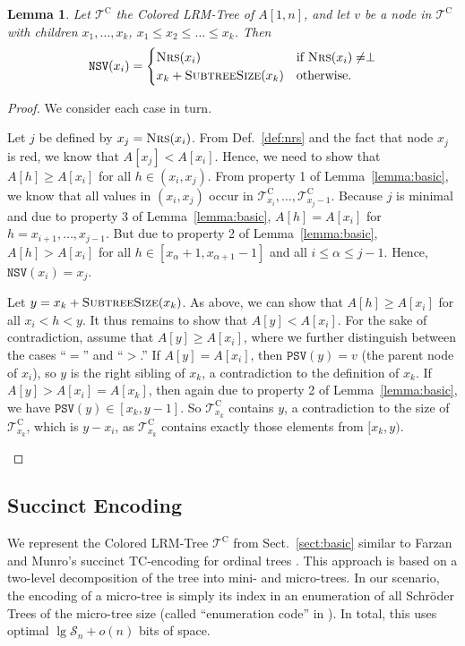 \documentclass[11pt,onecolumn,final]{article} \usepackage{a4}
\newcommand{\supcat}{\mathcal{S}}
\newcommand{\psv}[0]{\mathtt{PSV}}
\newcommand{\nsv}[0]{\mathtt{NSV}}
\newcommand{\ssize}{\ensuremath{\textsc{SubtreeSize}}}
\newcommand{\nrs}{\ensuremath{\textsc{Nrs}}} \newcommand{\laq}{\ensuremath{\textsc{Laq}}}
\theoremstyle{plain}
\newtheorem{lemma}[definition]{Lemma}
\theoremstyle{remark}
\begin{document}
\begin{lemma}
  \label{lemma:nsv}
  Let $\mathcal{T}^\textrm{C}$ the Colored LRM-Tree of $A[1,n]$, and let $v$ be a node in $\mathcal{T}^\textrm{C}$ with children $x_1,\dots,x_k$, $x_1\le x_2 \le \dots \le x_k$. Then
  $$
  \nsv(x_i)=\begin{cases}
    \nrs(x_i)  & \text{if }\nrs(x_i)\ne\perp\\
    x_k + \ssize({x_k}) & \text{otherwise.}
  \end{cases}
  $$
\end{lemma}
\begin{proof}
  We consider each case in turn.
  \begin{description}[\setlabelstyle{\normalfont}]
  \item[$\nrs(x_i)\ne\perp$.]
    Let $j$ be defined by $x_j=\nrs(x_i)$. From Def.~\ref{def:nrs} and the fact that node $x_j$ is red, we know that $A[x_j]<A[x_i]$. Hence, we need to show that $A[h]\ge A[x_i]$ for all $h \in (x_i,x_j)$. From property 1 of Lemma~\ref{lemma:basic}, we know that all values in $(x_i,x_j)$ occur in $\mathcal{T}^\textrm{C}_{x_i}, \dots, \mathcal{T}^\textrm{C}_{x_j-1}$. Because $j$ is minimal and due to property 3 of Lemma~\ref{lemma:basic}, $A[h]=A[x_i]$ for $h=x_{i+1},\dots,x_{j-1}$. But due to property 2 of Lemma~\ref{lemma:basic}, $A[h]>A[x_i]$ for all $h\in[x_{\alpha}+1,x_{\alpha+1}-1]$ and all $i\le\alpha\le j-1$. Hence, $\nsv(x_i)=x_j$.
  \item[$\nrs(x_i)=\perp$.]
    Let $y = x_k + \ssize({x_k})$. As above, we can show that $A[h]\ge A[x_i]$ for all $x_i < h < y$. It thus remains to show that $A[y] < A[x_i]$. For the sake of contradiction, assume that $A[y] \ge A[x_i]$, where we further distinguish between the cases ``$=$'' and ``$>$.'' If $A[y] = A[x_i]$, then $\psv(y) = v$ (the parent node of $x_i$), so $y$ is the right sibling of $x_k$, a contradiction to the definition of $x_k$. If $A[y] > A[x_i]=A[x_k]$, then again due to property 2 of Lemma~\ref{lemma:basic}, we have $\psv(y)\in[x_k,y-1]$. So $\mathcal{T}^\textrm{C}_{x_k}$ contains $y$, a contradiction to the size of $\mathcal{T}^\textrm{C}_{x_k}$, which is $y-x_i$, as $\mathcal{T}^\textrm{C}_{x_k}$ contains exactly those elements from $[x_k,y)$.
  \end{description}
\end{proof}

\subsection{Succinct Encoding}
\label{sect:succinct}
We represent the Colored LRM-Tree $\mathcal{T}^\textrm{C}$ from Sect.~\ref{sect:basic} similar to Farzan and Munro's succinct TC-encoding for ordinal trees \cite{farzan08uniform}. This approach is based on a two-level decomposition of the tree into mini- and micro-trees. In our scenario, the encoding of a micro-tree is simply its index in an enumeration of all Schr\"oder Trees of the micro-tree size (called ``enumeration code'' in \cite{farzan08uniform}). In total, this uses optimal $\lg\supcat_n+o(n)$ bits of space.
\end{document}

